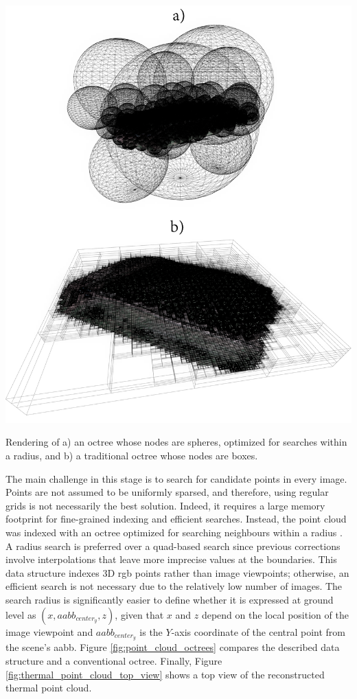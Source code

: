 \begin{marginfigure}[.0cm]
	\includegraphics{figs/thermal_projection/octrees.png}
    \caption{Rendering of a) an octree whose nodes are spheres, optimized for searches within a radius, and b) a traditional octree whose nodes are boxes. }
	\label{fig:point_cloud_octrees}
\end{marginfigure}
The main challenge in this stage is to search for candidate points in every image. Points are not assumed to be uniformly sparsed, and therefore, using regular grids is not necessarily the best solution. Indeed, it requires a large memory footprint for fine-grained indexing and efficient searches. Instead, the point cloud was indexed with an octree optimized for searching neighbours within a radius \cite{behley_efficient_2015}. A radius search is preferred over a quad-based search since previous corrections involve interpolations that leave more imprecise values at the boundaries. This data structure indexes 3D \acrshort{rgb} points rather than image viewpoints; otherwise, an efficient search is not necessary due to the relatively low number of images. The search radius is significantly easier to define whether it is expressed at ground level as $(x, \textit{aabb}_{\textit{center}_{y}}, z)$, given that $x$ and $z$ depend on the local position of the image viewpoint and $\textit{aabb}_{\textit{center}_{y}}$ is the $Y$-axis coordinate of the central point from the scene's \acrshort{aabb}. Figure \ref{fig:point_cloud_octrees} compares the described data structure and a conventional octree. Finally, Figure \ref{fig:thermal_point_cloud_top_view} shows a top view of the reconstructed thermal point cloud.

